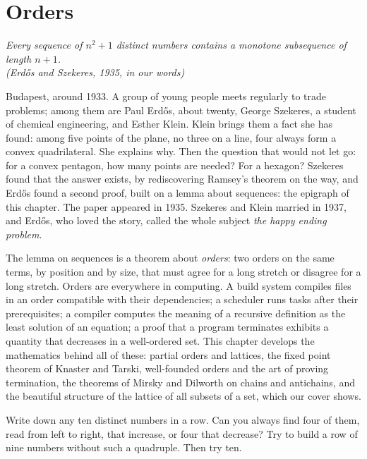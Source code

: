 \chapter{Orders}

\begin{center}\itshape
Every sequence of $n^2+1$ distinct numbers contains a monotone subsequence of length $n+1$.\\
\upshape(Erd\H os and Szekeres, 1935, in our words)
\end{center}

Budapest, around 1933. A group of young people meets regularly to trade
problems; among them are Paul Erd\H os, about twenty, George Szekeres, a student of chemical engineering, and Esther Klein.
Klein brings them a fact she has found: among five points of the plane, no three on a line, four always form a
convex quadrilateral. She explains why. Then the question that would not let go: for a
convex pentagon, how many points are needed? For a hexagon? Szekeres found that the answer exists, by rediscovering
Ramsey's theorem on the way, and Erd\H os found a second proof, built on a lemma about sequences: the epigraph of this
chapter. The paper appeared in 1935. Szekeres and Klein married in 1937, and Erd\H os, who loved the story, called the
whole subject \emph{the happy ending problem}.

The lemma on sequences is a theorem about \emph{orders}: two orders on the same terms, by position and by size,
that must agree for a long stretch or disagree for a long stretch. Orders are everywhere in computing. A build system
compiles files in an order compatible with their dependencies; a scheduler runs tasks after their prerequisites; a
compiler computes the meaning of a recursive definition as the least solution of an equation; a proof that a program
terminates exhibits a quantity that decreases in a well-ordered set. This chapter develops the mathematics behind all
of these: partial orders and lattices, the fixed point theorem of Knaster and Tarski, well-founded orders and the art
of proving termination, the theorems of Mirsky and Dilworth on chains and antichains, and the beautiful structure of
the lattice of all subsets of a set, which our cover shows.

\begin{think}
Write down any ten distinct numbers in a row. Can you always find four of them, read from left to right, that increase,
or four that decrease? Try to build a row of nine numbers without such a quadruple. Then try ten.
\end{think}

